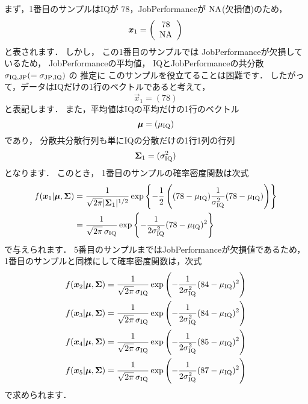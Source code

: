 \documentclass[a4j]{jarticle}\usepackage[]{graphicx}\usepackage[]{color}
\begin{document}
まず，1番目のサンプルはIQが $78$，JobPerformanceが $\mathrm{NA}$(欠損値)のため，
\begin{equation}
\mbox{\boldmath $x$}_{1} =
  \left(
    \begin{array}{c}
      78 \\
      \mathrm{NA}
    \end{array}
  \right)
\end{equation}
と表されます．
しかし，
この1番目のサンプルでは
JobPerformanceが欠損しているため，
JobPerformanceの平均値，
IQとJobPerformanceの共分散 $\sigma_{\mathrm{IQ}, \mathrm{JP}}(=\sigma_{\mathrm{JP}, \mathrm{IQ}})$ の
推定に
このサンプルを役立てることは困難です．
したがって，データはIQだけの1行のベクトルであると考えて，
\begin{equation}
\vec{x}_{1} = (78)
\end{equation}
と表記します．
また，平均値はIQの平均だけの1行のベクトル
\begin{equation}
\mbox{\boldmath $\mu$} = (\mu_{\mathrm{IQ}})
\end{equation}
であり，
分散共分散行列も単にIQの分散だけの1行1列の行列
\begin{equation}
\mbox{\boldmath $\Sigma$}_{1} = (\sigma_{\mathrm{IQ}}^2)
\end{equation}
となります．
このとき，
1番目のサンプルの確率密度関数は次式
\begin{align}
f(\mbox{\boldmath $x$}_{1} | \mbox{\boldmath $\mu$}, \mbox{\boldmath $\Sigma$})
&= \frac{1}{\sqrt{2\pi} |\mbox{\boldmath $\Sigma$}_{1}|^{1/2}} 
       \exp{
         \left\{
           -\frac{1}{2}
             \left(
               (78 - \mu_{\mathrm{IQ}})
               \frac{1}{\sigma_{\mathrm{IQ}}^2}
               (78 - \mu_{\mathrm{IQ}})
             \right)
         \right\}
       } \\
&= \frac{1}{\sqrt{2\pi} \, \sigma_{\mathrm{IQ}}}
       \exp{
         \left\{
           -\frac{1}{2\sigma_{\mathrm{IQ}}^2} (78 - \mu_{\mathrm{IQ}})^2
         \right\}
       }
\end{align}
で与えられます．
5番目のサンプルまではJobPerformanceが欠損値であるため，
1番目のサンプルと同様にして確率密度関数は，次式
\begin{align}
f(\mbox{\boldmath $x$}_{2} | \mbox{\boldmath $\mu$}, \mbox{\boldmath $\Sigma$})
&= \frac{1}{\sqrt{2\pi} \, \sigma_{\mathrm{IQ}}}
       \exp{
         \left(
           -\frac{1}{2\sigma_{\mathrm{IQ}}^2} (84 - \mu_{\mathrm{IQ}})^2
         \right)
       } \\
f(\mbox{\boldmath $x$}_{3} | \mbox{\boldmath $\mu$}, \mbox{\boldmath $\Sigma$})
  &= \frac{1}{\sqrt{2\pi} \, \sigma_{\mathrm{IQ}}}
       \exp{
         \left(
           -\frac{1}{2\sigma_{\mathrm{IQ}}^2} (84 - \mu_{\mathrm{IQ}})^2
         \right)
       } \\
f(\mbox{\boldmath $x$}_{4} | \mbox{\boldmath $\mu$}, \mbox{\boldmath $\Sigma$})
  &= \frac{1}{\sqrt{2\pi} \, \sigma_{\mathrm{IQ}}}
       \exp{
         \left(
           -\frac{1}{2\sigma_{\mathrm{IQ}}^2} (85 - \mu_{\mathrm{IQ}})^2
         \right)
       } \\
f(\mbox{\boldmath $x$}_{5} | \mbox{\boldmath $\mu$}, \mbox{\boldmath $\Sigma$})
  &= \frac{1}{\sqrt{2\pi} \, \sigma_{\mathrm{IQ}}}
       \exp{
         \left(
           -\frac{1}{2\sigma_{\mathrm{IQ}}^2} (87 - \mu_{\mathrm{IQ}})^2
         \right)
       }
\end{align}
で求められます．
\end{document}
